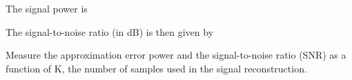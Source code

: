 \documentclass{article}
\begin{document}
\begin{CellGroup}
\begin{CellGroup}
\end{CellGroup}
\begin{CellGroup}

\end{CellGroup}
The signal power is 

The signal-to-noise ratio (in dB) is then given by 

\begin{CellGroup}

\end{CellGroup}
\begin{CellGroup}
Measure the approximation error power and the signal-to-noise ratio (SNR) as a function of K, the number of samples used in the signal reconstruction.


\end{CellGroup}

\end{CellGroup}
\end{document}
